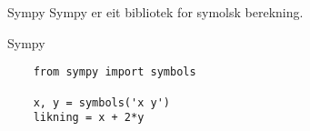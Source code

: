 \begin{frame}{Sympy}
	Sympy er eit bibliotek for symolsk berekning.
\end{frame}


\begin{frame}[containsverbatim]{Sympy}
\begin{verbatim}
	from sympy import symbols
	
	x, y = symbols('x y')
	likning = x + 2*y
\end{verbatim}
\end{frame}